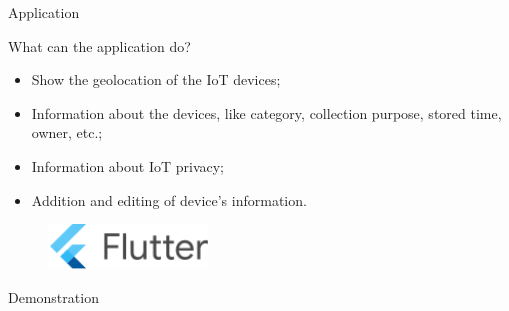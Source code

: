 \documentclass[xcolor={svgnames},compress,aspectratio=169]{beamer}
\begin{document}
\begin{frame}{Application}
    \begin{multicols}{2}
        What can the application do?
        \begin{itemize}
            \item Show the geolocation of the IoT devices;
            \item Information about the devices, like category, collection purpose, stored time, owner, etc.;
            \item Information about IoT privacy;
            \item Addition and editing of device's information.
        \end{itemize}

        \columnbreak
        \begin{figure}
            \centering\includegraphics[width=120pt]{assets/images/flutter.png}
        \end{figure}
        \begin{figure}
            \centering
            
        \end{figure}
    \end{multicols}
\end{frame}


{
\begin{frame}
    \centering
    \vspace*{\fill}
    {\Large Demonstration}
    \vspace*{\fill}
\end{frame}
}
\end{document}
